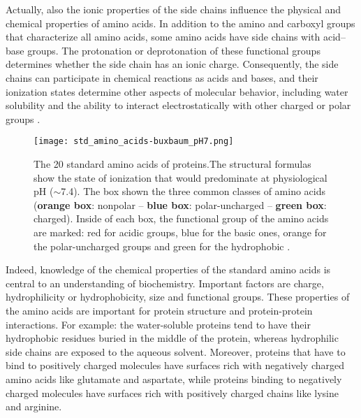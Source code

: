 Actually, also the ionic properties of the side chains influence the physical and chemical properties of amino acids. In addition to the amino and carboxyl groups that characterize all amino acids, some amino acids have side chains with acid--base groups. The protonation or deprotonation of these functional groups determines whether the side chain has an ionic charge. Consequently, the side chains can participate in chemical reactions as acids and bases, and their ionization states determine other aspects of molecular behavior, including water solubility and the ability to interact electrostatically with other charged or polar groups
\cite{voet2016fundamentals}.

\begin{figure}[h]
\centering
\begin{minipage}[t]{\textwidth}
\centering
\texttt{[image: std\_amino\_acids-buxbaum\_pH7.png]}

\caption{\small{The 20 standard amino acids of proteins.The structural formulas show the state of ionization that would predominate at physiological pH ($\sim$7.4). The box shown the three common classes of amino acids (\textbf{orange box}: nonpolar -- \textbf{blue box}: polar-uncharged -- \textbf{green box}: charged). Inside of each box, the functional group of the amino acids are marked: red for acidic groups, blue for the basic ones, orange for the polar-uncharged groups and green for the hydrophobic 
\cite{buxbaum2007fundamentals}.}}

\label{fig:StdAminoAcids}
\end{minipage} 
\end{figure}

Indeed, knowledge of the chemical properties of the standard amino acids is central to an understanding of biochemistry. Important factors are charge, hydrophilicity or hydrophobicity, size and functional groups. These properties of the amino acids are important for protein structure and protein-protein interactions. For example: the water-soluble proteins tend to have their hydrophobic residues buried in the middle of the protein, whereas hydrophilic side chains are exposed to the aqueous solvent. Moreover, proteins that have to bind to positively charged molecules have surfaces rich with negatively charged amino acids like glutamate and aspartate, while proteins binding to negatively charged molecules have surfaces rich with positively charged chains like lysine and arginine.


